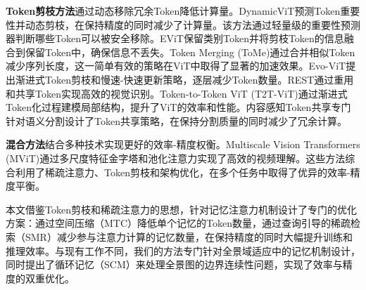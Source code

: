 \textbf{Token剪枝方法}通过动态移除冗余Token降低计算量。DynamicViT\cite{rao2021dynamicvit}预测Token重要性并动态剪枝，在保持精度的同时减少了计算量。该方法通过轻量级的重要性预测器判断哪些Token可以被安全移除。EViT保留类别Token并将剪枝Token的信息融合到保留Token中，确保信息不丢失。Token Merging (ToMe)\cite{bolya2023tome}通过合并相似Token减少序列长度，这一简单有效的策略在ViT中取得了显著的加速效果。Evo-ViT提出渐进式Token剪枝和慢速-快速更新策略，逐层减少Token数量。REST\cite{zhang2021rest}通过重用和共享Token实现高效的视觉识别。Token-to-Token ViT (T2T-ViT)\cite{yuan2021tokens}通过渐进式Token化过程建模局部结构，提升了ViT的效率和性能。内容感知Token共享\cite{lu2023tokensharing}专门针对语义分割设计了Token共享策略，在保持分割质量的同时减少了冗余计算。

\textbf{混合方法}结合多种技术实现更好的效率-精度权衡。Multiscale Vision Transformers (MViT)\cite{fan2021multiscale}通过多尺度特征金字塔和池化注意力实现了高效的视频理解。这些方法综合利用了稀疏注意力、Token剪枝和架构优化，在多个任务中取得了优异的效率-精度平衡。

本文借鉴Token剪枝和稀疏注意力的思想，针对记忆注意力机制设计了专门的优化方案：通过空间压缩（MTC）降低单个记忆的Token数量，通过查询引导的稀疏检索（SMR）减少参与注意力计算的记忆数量，在保持精度的同时大幅提升训练和推理效率。与现有工作不同，我们的方法专门针对全景域适应中的记忆机制设计，同时提出了循环记忆（SCM）来处理全景图的边界连续性问题，实现了效率与精度的双重优化。

